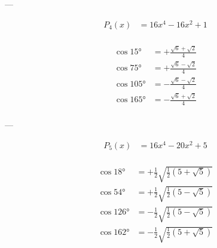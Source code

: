 ---

$$
\begin{aligned}
    P_{4}(x) &= 16 x^4-16 x^2+1\\
\end{aligned}
$$

$$
\begin{aligned}
    \cos 15°  &= +\frac{\sqrt{6}+\sqrt{2}}{4}\\
    \cos 75°  &= +\frac{\sqrt{6}-\sqrt{2}}{4}\\
    \cos 105° &= -\frac{\sqrt{6}-\sqrt{2}}{4}\\
    \cos 165° &= -\frac{\sqrt{6}+\sqrt{2}}{4}\\
\end{aligned}
$$

---

$$
\begin{aligned}
    P_{5}(x) &= 16 x^4-20 x^2+5\\
\end{aligned}
$$

$$
\begin{aligned}
    \cos 18°  &= +\frac{1}{2} \sqrt{\frac{1}{2} \left(5+\sqrt{5}\right)}\\
    \cos 54°  &= +\frac{1}{2} \sqrt{\frac{1}{2} \left(5-\sqrt{5}\right)}\\
    \cos 126° &= -\frac{1}{2} \sqrt{\frac{1}{2} \left(5-\sqrt{5}\right)}\\
    \cos 162° &= -\frac{1}{2} \sqrt{\frac{1}{2} \left(5+\sqrt{5}\right)}\\
\end{aligned}
$$

